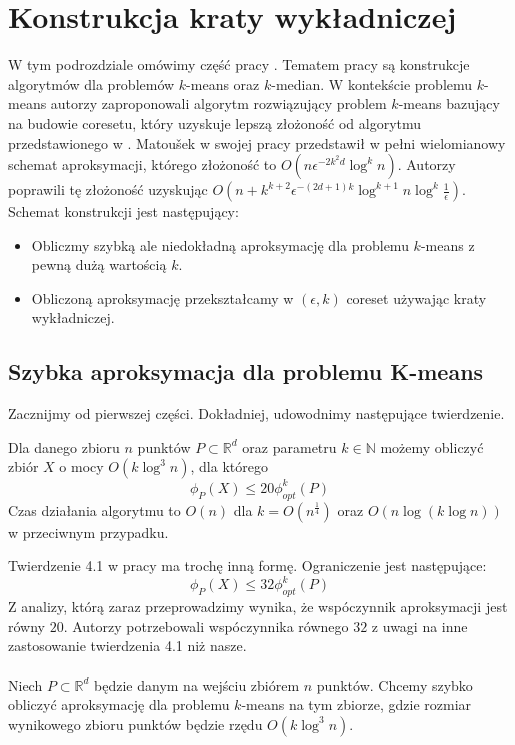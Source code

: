 \section{Konstrukcja kraty wykładniczej}

W tym podrozdziale omówimy część pracy \cite{10.1145/1007352.1007400}.
Tematem pracy są konstrukcje algorytmów dla problemów $k$-means oraz $k$-median.
W kontekście problemu $k$-means autorzy zaproponowali algorytm rozwiązujący problem $k$-means bazujący na budowie coresetu, który uzyskuje lepszą złożoność od algorytmu przedstawionego w \cite{Matousek99onapproximate}.
Matoušek w swojej pracy \cite{Matousek99onapproximate} przedstawił w pełni wielomianowy schemat aproksymacji, którego złożoność to $O(n\epsilon^{-2k^2d}\log^kn)$.
Autorzy \cite{10.1145/1007352.1007400} poprawili tę złożoność uzyskując $O(n+k^{k+2}\epsilon^{-(2d+1)k}\log^{k+1}n \log^k\frac{1}{\epsilon})$.
Schemat konstrukcji jest następujący:
\begin{itemize}
    \item Obliczmy szybką ale niedokładną aproksymację dla problemu $k$-means z pewną dużą wartością $k$.
    \item Obliczoną aproksymację przekształcamy w $(\epsilon, k)$ coreset używając kraty wykładniczej.
\end{itemize}


\subsection{Szybka aproksymacja dla problemu K-means}
\noindent
Zacznijmy od pierwszej części.
Dokładniej, udowodnimy następujące twierdzenie.

\begin{thm}{\cite{10.1145/1007352.1007400}}
    Dla danego zbioru $n$ punktów $P \subset \mathbb{R}^d$ oraz parametru $k \in \mathbb{N}$ możemy 
    obliczyć zbiór $X$ o mocy $O(k \log^{3}n)$, dla którego 
    \begin{equation}
        \phi_{P}(X) \leq 20 \phi_{opt}^{k}(P)
    \end{equation}
    Czas działania algorytmu to $O(n)$ dla $k = O(n^{\frac{1}{4}})$ oraz $O(n \log (k \log n))$ w przeciwnym przypadku.
\end{thm}

\noindent
Twierdzenie 4.1 w pracy \cite{10.1145/1007352.1007400} ma trochę inną formę.
Ograniczenie jest następujące:
\begin{equation}
    \phi_{P}(X) \leq 32 \phi_{opt}^{k}(P)
\end{equation}
Z analizy, którą zaraz przeprowadzimy wynika, że wspóczynnik aproksymacji jest równy $20$.
Autorzy potrzebowali wspóczynnika równego $32$ z uwagi na inne zastosowanie twierdzenia 4.1 niż nasze.
\\~\\
Niech $P \subset \mathbb{R}^{d}$ będzie danym na wejściu zbiórem $n$ punktów.
Chcemy szybko obliczyć aproksymację dla problemu $k$-means na tym zbiorze, gdzie rozmiar wynikowego zbioru punktów będzie rzędu $O(k \log^{3}n)$.

